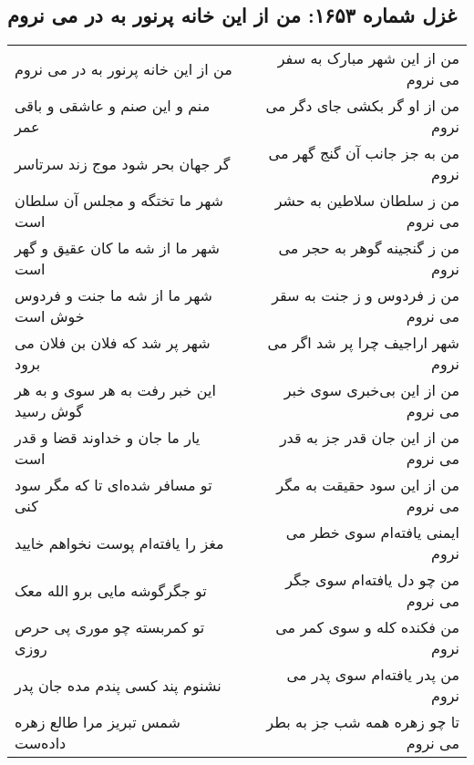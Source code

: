 \begin{center}
\section*{غزل شماره ۱۶۵۳: من از این خانه پرنور به در می نروم}
\label{sec:1653}
\begin{longtable}{l p{0.5cm} r}
من از این خانه پرنور به در می نروم
&&
من از این شهر مبارک به سفر می نروم
\\
منم و این صنم و عاشقی و باقی عمر
&&
من از او گر بکشی جای دگر می نروم
\\
گر جهان بحر شود موج زند سرتاسر
&&
من به جز جانب آن گنج گهر می نروم
\\
شهر ما تختگه و مجلس آن سلطان است
&&
من ز سلطان سلاطین به حشر می نروم
\\
شهر ما از شه ما کان عقیق و گهر است
&&
من ز گنجینه گوهر به حجر می نروم
\\
شهر ما از شه ما جنت و فردوس خوش است
&&
من ز فردوس و ز جنت به سقر می نروم
\\
شهر پر شد که فلان بن فلان می برود
&&
شهر اراجیف چرا پر شد اگر می نروم
\\
این خبر رفت به هر سوی و به هر گوش رسید
&&
من از این بی‌خبری سوی خبر می نروم
\\
یار ما جان و خداوند قضا و قدر است
&&
من از این جان قدر جز به قدر می نروم
\\
تو مسافر شده‌ای تا که مگر سود کنی
&&
من از این سود حقیقت به مگر می نروم
\\
مغز را یافته‌ام پوست نخواهم خایید
&&
ایمنی یافته‌ام سوی خطر می نروم
\\
تو جگرگوشه مایی برو الله معک
&&
من چو دل یافته‌ام سوی جگر می نروم
\\
تو کمربسته چو موری پی حرص روزی
&&
من فکنده کله و سوی کمر می نروم
\\
نشنوم پند کسی پندم مده جان پدر
&&
من پدر یافته‌ام سوی پدر می نروم
\\
شمس تبریز مرا طالع زهره داده‌ست
&&
تا چو زهره همه شب جز به بطر می نروم
\\
\end{longtable}
\end{center}
